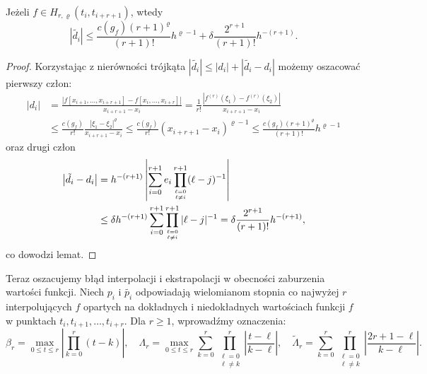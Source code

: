 \documentclass[oik, pdftex, robocza, man]{mgrwms}
\begin{document}
    \begin{lemma} \label{lem:algMP_1}
        Jeżeli $f \in H_{r, \varrho}(t_{i}, t_{i+r+1})$, wtedy
        \begin{equation*}
            |\tilde{d_{i}}| \leq \frac{c(g_{f})(r+1)^{\varrho}}{(r+1)!} h^{\varrho-1} + \delta \frac{2^{r+1}}{(r+1)!} h^{-(r+1)}.
        \end{equation*}
    \end{lemma}
    \begin{proof}
        Korzystając z nierówności trójkąta $|\tilde{d_{i}}|  \leq |d_{i}| + |\tilde{d_{i}} - d_{i}|$ możemy oszacować pierwszy człon:
        \begin{equation}
            \begin{aligned}
            \left|d_{i}\right| &=\frac{\left|f\left[x_{i+1}, \ldots, x_{i+r+1}\right]-f\left[x_{i}, \ldots, x_{i+r}\right]\right|}{x_{i+r+1}-x_{i}} 
                = \frac{1}{r !} \frac{\left|f^{(r)}\left(\xi_{1}\right)-f^{(r)}\left(\xi_{2}\right)\right|}{x_{i+r+1}-x_{i}} \\
            & \leq \frac{c\left(g_{f}\right)}{r !} \frac{\left|\xi_{1}-\xi_{2}\right|^{\varrho}}{x_{i+r+1}-x_{i}} 
                \leq \frac{c\left(g_{f}\right)}{r !}\left(x_{i+r+1}-x_{i}\right)^{\varrho-1} 
                \leq \frac{c\left(g_{f}\right)(r+1)^{\varrho}}{(r+1) !} h^{\varrho-1}
            \end{aligned}
        \end{equation}
        oraz drugi człon
        \begin{equation}
            \begin{aligned}
            \left|\tilde{d}_{i}-d_{i}\right| & =h^{-(r+1)}\left|\sum_{i=0}^{r+1} e_{i} \prod_{\ell=0 \atop \ell \neq i}^{r+1}(\ell-j)^{-1}\right| \\
            & \leq \delta h^{-(r+1)} \sum_{i=0}^{r+1} \prod_{\ell=0 \atop \ell \neq i}^{r+1}|\ell-j|^{-1}=\delta \frac{2^{r+1}}{(r+1) !} h^{-(r+1)},
            \end{aligned}
        \end{equation}
        co dowodzi lemat.
    \end{proof}

    Teraz oszacujemy błąd interpolacji i ekstrapolacji w obecności zaburzenia wartości funkcji. Niech $p_{i}$ i $\tilde{p_{i}}$ odpowiadają wielomianom stopnia co najwyżej $r$ interpolujących $f$ opartych na dokładnych i niedokładnych wartościach funkcji $f$ w punktach $t_{i}, t_{i+1}, \dots, t_{i+r}$. Dla $r \geq 1$, wprowadźmy oznaczenia: 
    \begin{equation*}
        \beta_{r} = \max_{0 \leq t \leq r} \left|\prod_{k=0}^{r} (t-k)\right|, \quad
        \Lambda_{r} = \max_{0 \leq t \leq r} \sum_{k=0}^{r} \prod_{\substack{\ell=0 \\ \ell \neq k}}^{r} \left| \frac{t-\ell}{k-\ell} \right|, \quad
        \tilde{\Lambda}_{r} = \sum_{k=0}^{r} \prod_{\substack{\ell=0 \\ \ell \neq k}}^{r} \left| \frac{2r+1-\ell}{k-\ell} \right|.
    \end{equation*}
\end{document}
